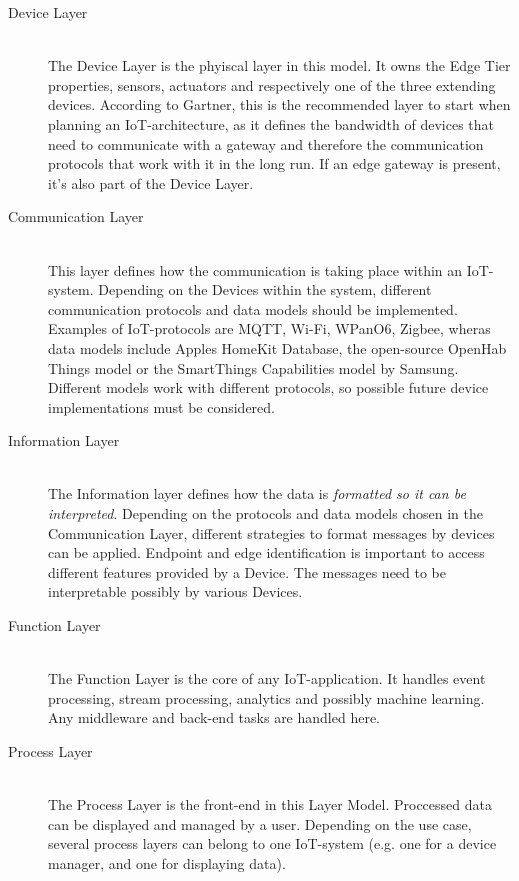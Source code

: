 \begin{description}
    \item[Device Layer] \hfill \\
    The Device Layer is the phyiscal layer in this model. 
    It owns the Edge Tier properties, sensors, actuators and respectively one of the three extending devices. 
    According to Gartner, this is the recommended layer to start when planning an IoT-architecture, as it defines the bandwidth of devices that need 
    to communicate with a gateway and therefore the communication protocols that work with it in the long run.
    If an edge gateway is present, it's also part of the Device Layer.
    \item[Communication Layer] \hfill \\
    This layer defines how the communication is taking place within an IoT-system.
    Depending on the Devices within the system, different communication protocols and data models should be implemented.
    Examples of IoT-protocols are MQTT, Wi-Fi, WPanO6, Zigbee, 
    wheras data models include Apples HomeKit Database, the open-source OpenHab Things model or the SmartThings Capabilities model by Samsung. 
    Different models work with different protocols, 
    so possible future device implementations must be considered.
    \item[Information Layer]  \hfill \\ 
    The Information layer defines how the data is \textit{formatted so it can be interpreted}.
    Depending on the protocols and data models chosen in the Communication Layer, 
    different strategies to format messages by devices can be applied.
    Endpoint and edge identification is important to access different features provided by a Device.
    The messages need to be interpretable possibly by various Devices.
    \item[Function Layer] \hfill \\ 
    The Function Layer is the core of any IoT-application.
    It handles event processing, stream processing, analytics and possibly machine learning.
    Any middleware and back-end tasks are handled here.
    \item[Process Layer]   \hfill \\
    The Process Layer is the front-end in this Layer Model. Proccessed data can be displayed and managed by a user. 
    Depending on the use case, several process layers can belong to one IoT-system (e.g. one for a device manager, and one for displaying data).
\end{description}


